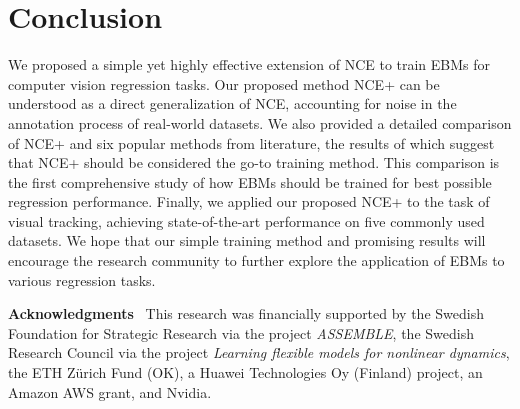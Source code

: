 \documentclass{bmvc2k}
\newcommand{\parsection}[1]{\vspace{2mm}\noindent\textbf{#1}~ }
\begin{document}
 \section{Conclusion}
\label{section: conclusion}
We proposed a simple yet highly effective extension of NCE to train EBMs  for computer vision regression tasks. Our proposed method NCE+ can be understood as a direct generalization of NCE, accounting for noise in the annotation process of real-world datasets. We also provided a detailed comparison of NCE+ and six popular methods from literature, the results of which suggest that NCE+ should be considered the go-to training method. This comparison is the first comprehensive study of how EBMs should be trained for best possible regression performance. Finally, we applied our proposed NCE+ to the task of visual tracking, achieving state-of-the-art performance on five commonly used datasets. We hope that our simple training method and promising results will encourage the research community to further explore the application of EBMs to various regression tasks.


 
\parsection{Acknowledgments}
This research was financially supported by the Swedish Foundation for Strategic Research via the project \emph{ASSEMBLE}, the Swedish Research Council via the project \emph{Learning flexible models for nonlinear dynamics}, the ETH Z\"urich Fund (OK), a Huawei Technologies Oy (Finland) project, an Amazon AWS grant, and Nvidia.










\clearpage

\renewcommand{\thefigure}{S\arabic{figure}}
\setcounter{figure}{0}

\renewcommand{\thetable}{S\arabic{table}}
\setcounter{table}{0}

\renewcommand{\thealgorithm}{S\arabic{algorithm}}
\setcounter{algorithm}{0}

\renewcommand{\theequation}{S\arabic{equation}}
\setcounter{equation}{0}



\section*{}
\end{document}
